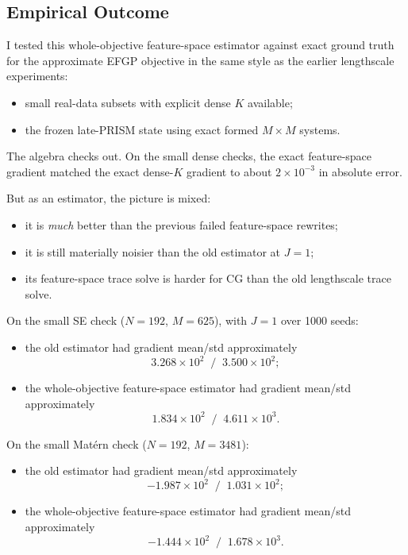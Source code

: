\documentclass[11pt]{article}
\begin{document}
\subsection*{Empirical Outcome}

I tested this whole-objective feature-space estimator against exact ground truth
for the approximate EFGP objective in the same style as the earlier
lengthscale experiments:
\begin{itemize}
  \item small real-data subsets with explicit dense $K$ available;
  \item the frozen late-PRISM state using exact formed $M\times M$ systems.
\end{itemize}

The algebra checks out. On the small dense checks, the exact feature-space
gradient matched the exact dense-$K$ gradient to about $2\times 10^{-3}$ in
absolute error.

But as an estimator, the picture is mixed:
\begin{itemize}
  \item it is \emph{much} better than the previous failed feature-space
  rewrites;
  \item it is still materially noisier than the old estimator at $J=1$;
  \item its feature-space trace solve is harder for CG than the old
  lengthscale trace solve.
\end{itemize}

On the small SE check ($N=192$, $M=625$), with $J=1$ over 1000 seeds:
\begin{itemize}
  \item the old estimator had gradient mean/std approximately
  \[
    3.268\times 10^2 \;\; / \;\; 3.500\times 10^2;
  \]
  \item the whole-objective feature-space estimator had gradient mean/std
  approximately
  \[
    1.834\times 10^2 \;\; / \;\; 4.611\times 10^3.
  \]
\end{itemize}

On the small Mat\'ern check ($N=192$, $M=3481$):
\begin{itemize}
  \item the old estimator had gradient mean/std approximately
  \[
    -1.987\times 10^2 \;\; / \;\; 1.031\times 10^2;
  \]
  \item the whole-objective feature-space estimator had gradient mean/std
  approximately
  \[
    -1.444\times 10^2 \;\; / \;\; 1.678\times 10^3.
  \]
\end{itemize}
\end{document}
